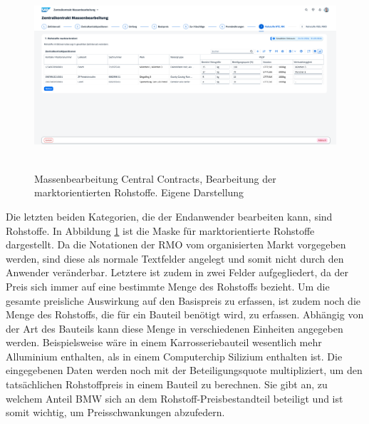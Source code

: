 \begin{figure}[H]
    \centering
    \includegraphics[height=6.91cm]{Bilder/Praxisteil-KL-Schritt-7.png}
    \caption[Massenbearbeitung Central Contracts, Bearbeitung der marktorientierten Rohstoffe]{Massenbearbeitung Central Contracts, Bearbeitung der marktorientierten Rohstoffe. Eigene Darstellung}
    \label{fig:PraxisKLSchritt7}
\end{figure}

Die letzten beiden Kategorien, die der Endanwender bearbeiten kann, sind Rohstoffe. In Abbildung \ref{fig:PraxisKLSchritt7} ist die Maske für marktorientierte Rohstoffe dargestellt. Da die Notationen der RMO vom organisierten Markt vorgegeben werden, sind diese als normale Textfelder angelegt und somit nicht durch den Anwender veränderbar. Letztere ist zudem in zwei Felder aufgegliedert, da der Preis sich immer auf eine bestimmte Menge des Rohstoffs bezieht. Um die gesamte preisliche Auswirkung auf den Basispreis zu erfassen, ist zudem noch die Menge des Rohstoffs, die für ein Bauteil benötigt wird, zu erfassen. Abhängig von der Art des Bauteils kann diese Menge in verschiedenen Einheiten angegeben werden. Beispielsweise wäre in einem Karrosseriebauteil wesentlich mehr Alluminium enthalten, als in einem Computerchip Silizium enthalten ist. Die eingegebenen Daten werden noch mit der Beteiligungsquote multipliziert, um den tatsächlichen Rohstoffpreis in einem Bauteil zu berechnen. Sie gibt an, zu welchem Anteil BMW sich an dem Rohstoff-Preisbestandteil beteiligt und ist somit wichtig, um Preisschwankungen abzufedern.

